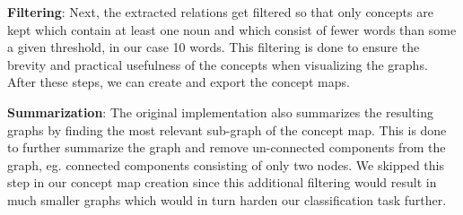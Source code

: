 \textbf{Filtering}:
Next, the extracted relations get filtered so that only concepts are kept which contain at least one noun and which consist of fewer words than some a given threshold, in our case 10 words. This filtering is done to ensure the brevity and practical usefulness of the concepts when visualizing the graphs.
After these steps, we can create and export the concept maps.

\textbf{Summarization}:
The original implementation also summarizes the resulting graphs by finding the most relevant sub-graph of the concept map.
This is done to further summarize the graph and remove un-connected components from the graph, eg. connected components consisting of only two nodes.
We skipped this step in our concept map creation since this additional filtering would result in much smaller graphs which would in turn harden our classification task further.